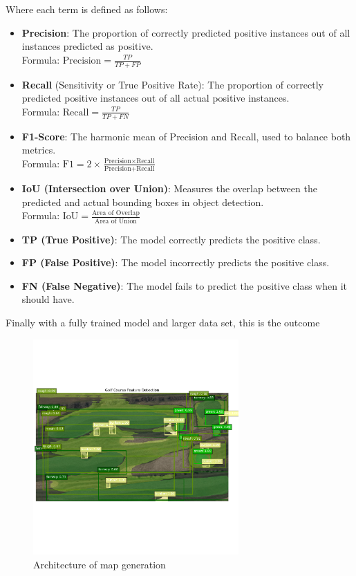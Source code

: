 \documentclass[final]{cmpreport_02}
\begin{document}
Where each term is defined as follows:
\begin{itemize}
    \item \textbf{Precision}: The proportion of correctly predicted positive instances out of all instances predicted as positive.\\
    Formula: $\displaystyle \text{Precision} = \frac{TP}{TP + FP}$

    \item \textbf{Recall} (Sensitivity or True Positive Rate): The proportion of correctly predicted positive instances out of all actual positive instances.\\
    Formula: $\displaystyle \text{Recall} = \frac{TP}{TP + FN}$

    \item \textbf{F1-Score}: The harmonic mean of Precision and Recall, used to balance both metrics.\\
    Formula: $\displaystyle \text{F1} = 2 \times \frac{\text{Precision} \times \text{Recall}}{\text{Precision} + \text{Recall}}$

    \item \textbf{IoU (Intersection over Union)}: Measures the overlap between the predicted and actual bounding boxes in object detection.\\
    Formula: $\displaystyle \text{IoU} = \frac{\text{Area of Overlap}}{\text{Area of Union}}$

    \item \textbf{TP (True Positive)}: The model correctly predicts the positive class.

    \item \textbf{FP (False Positive)}: The model incorrectly predicts the positive class.

    \item \textbf{FN (False Negative)}: The model fails to predict the positive class when it should have.
\end{itemize}

Finally with a fully trained model and larger data set, this is the outcome

\begin{figure}[H]
	\centering
	\includegraphics[width=0.7\textwidth]{./images/AEModelDone.png}
	\caption{Architecture of map generation}
	\label{AE:Done}
\end{figure}
\end{document}
